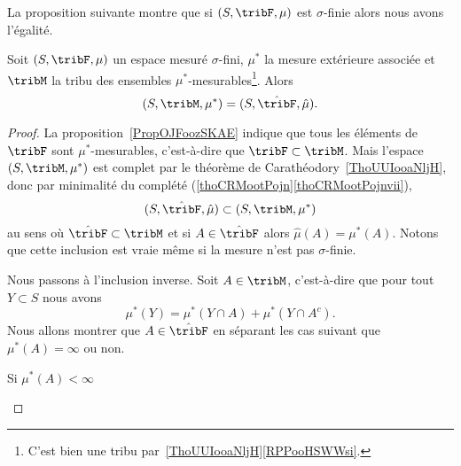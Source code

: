 La proposition suivante montre que si \( (S,\tribF,\mu)\) est \( \sigma\)-finie alors nous avons l'égalité.
\begin{proposition} \label{PropIIHooAIbfj}
    Soit \( (S,\tribF,\mu)\) un espace mesuré \( \sigma\)-fini, \( \mu^*\) la mesure extérieure associée et \( \tribM\) la tribu des ensembles \( \mu^*\)-mesurables\footnote{C'est bien une tribu par~\ref{ThoUUIooaNljH}\ref{RPPooHSWWsi}.}. Alors
    \begin{equation}
    (S,\tribM,\mu^*) = (S,\hat\tribF,\hat\mu).
    \end{equation}
\end{proposition}

\begin{proof}
    La proposition~\ref{PropOJFoozSKAE} indique que tous les éléments de \( \tribF\) sont \( \mu^*\)-mesurables, c'est-à-dire que \( \tribF\subset \tribM\). Mais l'espace \( (S,\tribM,\mu^*)\) est complet par le théorème de Carathéodory~\ref{ThoUUIooaNljH}, donc par minimalité du complété (\ref{thoCRMootPojn}\ref{thoCRMootPojnvii}),
    \begin{equation}
        (S,\hat\tribF,\hat\mu)\subset(S,\tribM,\mu^*)
    \end{equation}
    au sens où \( \hat\tribF\subset\tribM\) et si \( A\in\hat\tribF\) alors \( \hat\mu(A)=\mu^*(A)\). Notons que cette inclusion est vraie même si la mesure n'est pas \( \sigma\)-finie.

    Nous passons à l'inclusion inverse. Soit \( A\in\tribM\), c'est-à-dire que pour tout \( Y\subset S\) nous avons
    \begin{equation}    \label{EqTZAooTCdGg}
        \mu^*(Y)=\mu^*(Y\cap A)+\mu^*(Y\cap A^c).
    \end{equation}
    Nous allons montrer que \( A\in\hat\tribF\) en séparant les cas suivant que \( \mu^*(A)=\infty\) ou non.

    \begin{subproof}
        \item[Si \( \mu^*(A)<\infty\)]


\end{subproof}
\end{proof}
